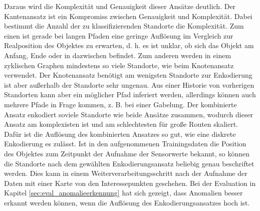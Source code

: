 Daraus wird die Komplexität und Genauigkeit dieser Ansätze deutlich.
Der Kantenansatz ist ein Kompromiss zwischen Genauigkeit und Komplexität.
Dabei bestimmt die Anzahl der zu klassifizierenden Standorte die Komplexität.
Zum einen ist gerade bei langen Pfaden eine geringe Auflösung im Vergleich zur Realposition des Objektes zu erwarten,
d. h. es ist unklar, ob sich das Objekt am Anfang, Ende oder in dazwischen befindet.
Zum anderen werden in einem zyklischen Graphen mindestens so viele Standorte, wie beim Knotenansatz verwendet.
Der Knotenansatz benötigt am wenigsten Standorte zur Enkodierung ist aber außerhalb der Standorte sehr ungenau.
Aus einer Historie von vorherigen Standorten kann aber ein möglicher Pfad inferiert werden,
allerdings können auch mehrere Pfade in Frage kommen, z. B. bei einer Gabelung.
Der kombinierte Ansatz enkodiert soviele Standorte wie beide Ansätze zusammen,
wodurch dieser Ansatz am komplexisten ist und am schlechtesten für große Routen skaliert.
Dafür ist die Auflösung des kombinierten Ansatzes so gut, wie eine diskrete Enkodierung es zulässt.
\newline
\newline
Ist in den aufgenommenen Trainingsdaten die Position des Objektes zum Zeitpunkt der Aufnahme der Sensorwerte bekannt,
so können die Standorte nach dem gewählten Enkodierungsansatz beliebig genau beschriftet werden.
Dies kann in einem Weiterverarbeitungsschritt nach der Aufnahme der Daten mit einer Karte von den Interessepunkten geschehen.
\newline
\newline
Bei der Evaluation in Kapitel \ref{sec:eval_anomalieerkennung} hat sich gezeigt, dass Anomalien besser erkannt werden können,
wenn die Auflösung des Enkodierungsansatzes hoch ist.